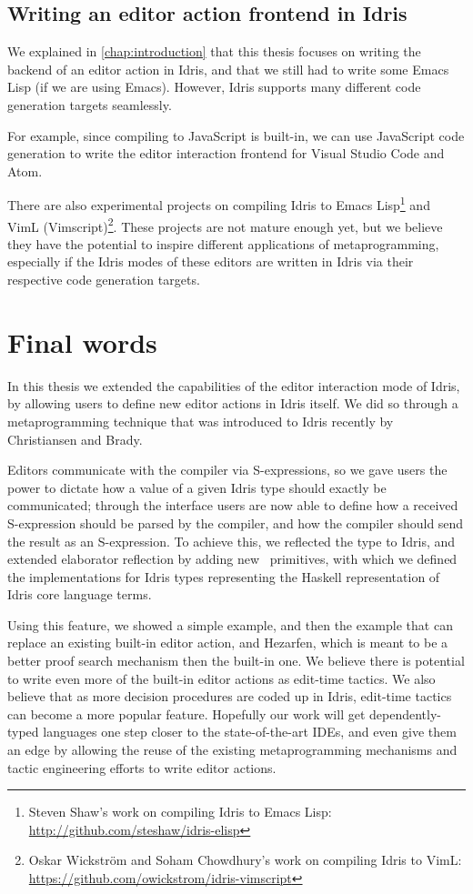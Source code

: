 \subsection{Writing an editor action frontend in Idris}

We explained in \autoref{chap:introduction} that this thesis focuses on writing
the backend of an editor action in Idris, and that we still had to write some
Emacs Lisp (if we are using Emacs). However, Idris supports many different
code generation targets\cite{idriscodegen} seamlessly.

For example, since compiling to JavaScript is built-in, we can use JavaScript
code generation to write the editor interaction frontend for Visual Studio Code
and Atom.

There are also experimental projects on compiling Idris to Emacs
Lisp\footnote{Steven Shaw's work on compiling Idris to Emacs Lisp:
\url{http://github.com/steshaw/idris-elisp}} and VimL
(Vimscript)\footnote{Oskar Wickstr\"om and Soham Chowdhury's work on
compiling Idris to VimL:
\url{https://github.com/owickstrom/idris-vimscript}}. These projects are not
mature enough yet, but we believe they have the potential to inspire different
applications of metaprogramming, especially if the Idris modes of these editors
are written in Idris via their respective code generation targets.

\section{Final words}

In this thesis we extended the capabilities of the editor interaction mode of
Idris, by allowing users to define new editor actions in Idris itself. We did
so through a metaprogramming technique that was introduced to Idris recently by
Christiansen and Brady\cite{elabref}.

Editors communicate with the compiler via S-expressions, so we gave users the
power to dictate how a value of a given Idris type should exactly be
communicated; through the  interface users are now able to
define how a received S-expression should be parsed by the compiler, and how
the compiler should send the result as an S-expression. To achieve this, we
reflected the  type to Idris, and extended elaborator reflection
by adding new \Elab\ primitives, with which we defined the 
implementations for Idris types representing the Haskell representation of
Idris core language terms.

Using this feature, we showed a simple  example, and then the
 example that can replace an existing built-in editor action,
and Hezarfen, which is meant to be a better proof search mechanism then the
built-in one. We believe there is potential to write even more of the built-in
editor actions as edit-time tactics. We also believe that as more decision
procedures are coded up in Idris, edit-time tactics can become a more popular
feature.
Hopefully our work will get dependently-typed languages one step closer to the
state-of-the-art IDEs, and even give them an edge by allowing the reuse of the
existing metaprogramming mechanisms and tactic engineering efforts to write
editor actions.
